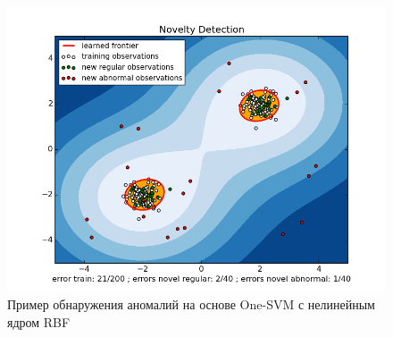 \begin{figure}
  \centering
  \includegraphics[scale=0.3]{inc/images/rbf-demo.png}
  \caption{Пример обнаружения аномалий на основе One-SVM с нелинейным ядром RBF \cite{Skilear-RBF-Doc}}
  \label{fig:rbf-demo}
\end{figure}




